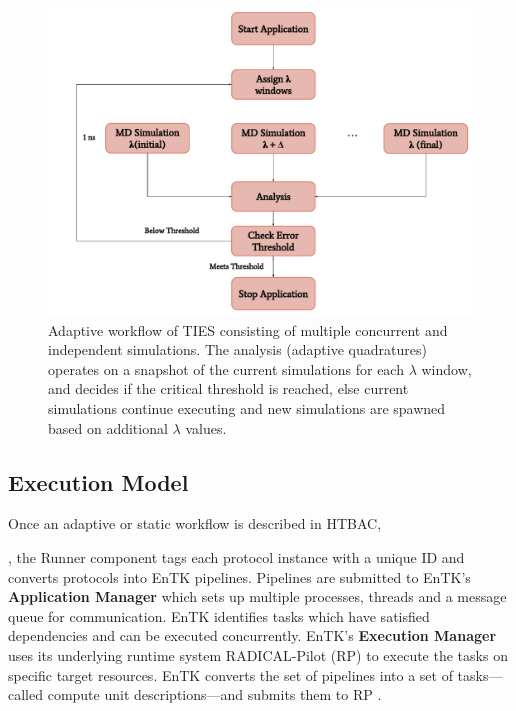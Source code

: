 \begin{figure}
  \centering
  \includegraphics[width=\columnwidth]{figures/adaptive_TIES_workflow_diagram.pdf}
  \caption{Adaptive workflow of TIES consisting of multiple concurrent and
  independent simulations. The analysis (adaptive quadratures) operates on a
  snapshot of the current simulations for each $\lambda$ window, and decides
  if the critical threshold is reached, else current simulations continue
  executing and new simulations are spawned based on additional $\lambda$
  values.}
\label{fig:adaptive_ties}
\end{figure}

\subsection{Execution Model}

Once an adaptive or static workflow is described in HTBAC,

, the Runner component tags
each protocol instance with a unique ID and converts protocols into EnTK
pipelines.
Pipelines are submitted to EnTK's \textbf{Application Manager} which sets up
multiple processes, threads and a message queue for communication. EnTK
identifies tasks which have satisfied dependencies and can be executed
concurrently. EnTK's \textbf{Execution Manager} uses its underlying runtime
system RADICAL-Pilot (RP) to execute the tasks on specific target resources.
EnTK converts the set of pipelines into a set of tasks---called compute unit
descriptions---and submits them to RP .

